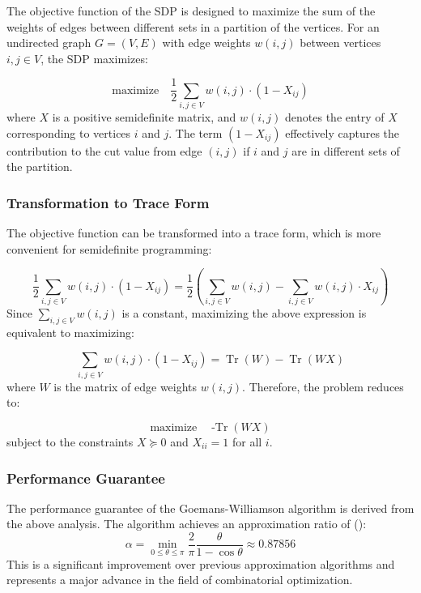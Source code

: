     The objective function of the SDP is designed to maximize the sum of the weights of edges between different sets in a partition of the vertices. For an undirected graph \( G = (V, E) \) with edge weights \( w(i, j) \) between vertices \( i, j \in V \), the SDP maximizes:
    
    \[
    \text{maximize} \quad \frac{1}{2} \sum_{i, j \in V} w(i, j) \cdot (1 - X_{ij})
    \]
    where \( X \) is a positive semidefinite matrix, and \( w(i, j) \) denotes the entry of \( X \) corresponding to vertices \( i \) and \( j \). The term \( (1 - X_{ij}) \) effectively captures the contribution to the cut value from edge \( (i, j) \) if \( i \) and \( j \) are in different sets of the partition.
    
    \subsubsection{\textbf{Transformation to Trace Form}}
    
    The objective function can be transformed into a trace form, which is more convenient for semidefinite programming:
    
    \[
    \frac{1}{2} \sum_{i, j \in V} w(i, j) \cdot (1 - X_{ij}) = \frac{1}{2} \left( \sum_{i, j \in V} w(i, j) - \sum_{i, j \in V} w(i, j) \cdot X_{ij} \right)
    \]
    Since \(\sum_{i, j \in V} w(i, j)\) is a constant, maximizing the above expression is equivalent to maximizing:
    
    \[
    \sum_{i, j \in V} w(i, j) \cdot (1 - X_{ij}) = \operatorname{Tr}(W) - \operatorname{Tr}(W X)
    \]
    where \( W \) is the matrix of edge weights \( w(i, j) \). Therefore, the problem reduces to:
    
    \[
    \text{maximize} \quad \operatorname{-Tr}(W X)
    \]
    subject to the constraints \( X \succeq 0 \) and \( X_{ii} = 1 \) for all \( i \).
    

    \subsubsection{\textbf{Performance Guarantee}}

    The performance guarantee of the Goemans-Williamson algorithm is derived from the above analysis. The algorithm achieves an approximation ratio of ():
    \[
    \alpha = \min\limits_{0 \leq \theta \leq \pi} \frac{2}{\pi} \frac{\theta}{1 - \cos \theta} \approx 0.87856
    \]
    This is a significant improvement over previous approximation algorithms and represents a major advance in the field of combinatorial optimization.



